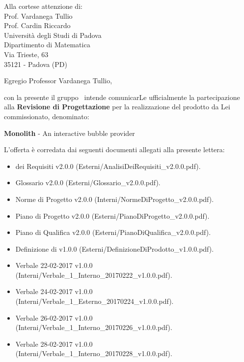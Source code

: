 

\newcommand{\logo}{../../Template/Logo/Logo.png}
\newcommand{\data}{\today}
\newcommand{\oggetto}{Partecipazione alla Revisione di Progettazione.}
\newcommand{\mittente}{Francesco Bazzerla \\ Responsabile NPE Developers}
\newcommand{\firma}{../../Template/Firme/FB.png}





\begin{letter}{Alla cortese attenzione di:  \\
 Prof. Vardanega Tullio \\
 Prof. Cardin Riccardo \\
 Università degli Studi di Padova \\
 Dipartimento di Matematica \\
 Via Trieste, 63 \\
 35121 - Padova (PD)}

\opening{Egregio Professor Vardanega Tullio,} 

con la presente il gruppo \gruppo\ intende comunicarLe ufficialmente la partecipazione alla \textbf{Revisione di Progettazione} per la realizzazione del prodotto da Lei commissionato, denominato:
\begin{center}
\textbf{Monolith} - An interactive bubble provider
\end{center}
L'offerta è corredata dai seguenti documenti allegati alla presente lettera:
\begin{itemize}
	\item {} dei Requisiti v2.0.0 (Esterni/AnalisiDeiRequisiti\_v2.0.0.pdf).
	\item Glossario v2.0.0 (Esterni/Glossario\_v2.0.0.pdf).
	\item Norme di Progetto v2.0.0 (Interni/NormeDiProgetto\_v2.0.0.pdf).
	\item Piano di Progetto v2.0.0 (Esterni/PianoDiProgetto\_v2.0.0.pdf).
	\item Piano di Qualifica v2.0.0 (Esterni/PianoDiQualifica\_v2.0.0.pdf).
	\item Definizione di  v1.0.0 (Esterni/DefinizioneDiProdotto\_v1.0.0.pdf).
	\item Verbale 22-02-2017 v1.0.0 (Interni/Verbale\_1\_Interno\_20170222\_v1.0.0.pdf).
	\item Verbale 24-02-2017 v1.0.0 (Interni/Verbale\_1\_Esterno\_20170224\_v1.0.0.pdf).
	\item Verbale 26-02-2017 v1.0.0 (Interni/Verbale\_1\_Interno\_20170226\_v1.0.0.pdf).
	\item Verbale 28-02-2017 v1.0.0 (Interni/Verbale\_1\_Interno\_20170228\_v1.0.0.pdf).
\end{itemize}


\end{letter}
